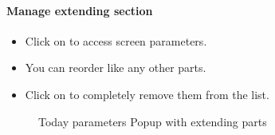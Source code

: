 \documentclass[letterpaper,10pt,english]{sphinxmanual}
\begin{document}
\paragraph{Manage extending section}
\begin{itemize}
\item {} 
Click on  to access screen parameters.

\item {} 
You can reorder like any other parts.

\item {} 
Click on  to completely remove them from the list.

\end{itemize}
\begin{figure}[htbp]
\centering
\capstart

\caption{Today parameters Popup with extending parts}\end{figure}
\end{document}
